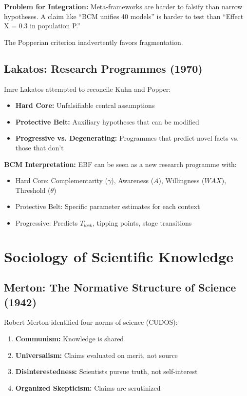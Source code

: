 \textbf{Problem for Integration:}
Meta-frameworks are harder to falsify than narrow hypotheses. A claim like ``BCM unifies 40 models'' is harder to test than ``Effect X = 0.3 in population P.''

The Popperian criterion inadvertently favors fragmentation.

\subsection{Lakatos: Research Programmes (1970)}

Imre Lakatos attempted to reconcile Kuhn and Popper:
\begin{itemize}
\item \textbf{Hard Core:} Unfalsifiable central assumptions
\item \textbf{Protective Belt:} Auxiliary hypotheses that can be modified
\item \textbf{Progressive vs. Degenerating:} Programmes that predict novel facts vs. those that don't
\end{itemize}

\textbf{BCM Interpretation:}
EBF can be seen as a new research programme with:
\begin{itemize}
\item Hard Core: Complementarity ($\gamma$), Awareness ($A$), Willingness ($WAX$), Threshold ($\theta$)
\item Protective Belt: Specific parameter estimates for each context
\item Progressive: Predicts $T_{lock}$, tipping points, stage transitions
\end{itemize}



\section{Sociology of Scientific Knowledge}
\label{sec:meta-ssk}

\subsection{Merton: The Normative Structure of Science (1942)}

Robert Merton identified four norms of science (CUDOS):
\begin{enumerate}
\item \textbf{Communism:} Knowledge is shared
\item \textbf{Universalism:} Claims evaluated on merit, not source
\item \textbf{Disinterestedness:} Scientists pursue truth, not self-interest
\item \textbf{Organized Skepticism:} Claims are scrutinized
\end{enumerate}

